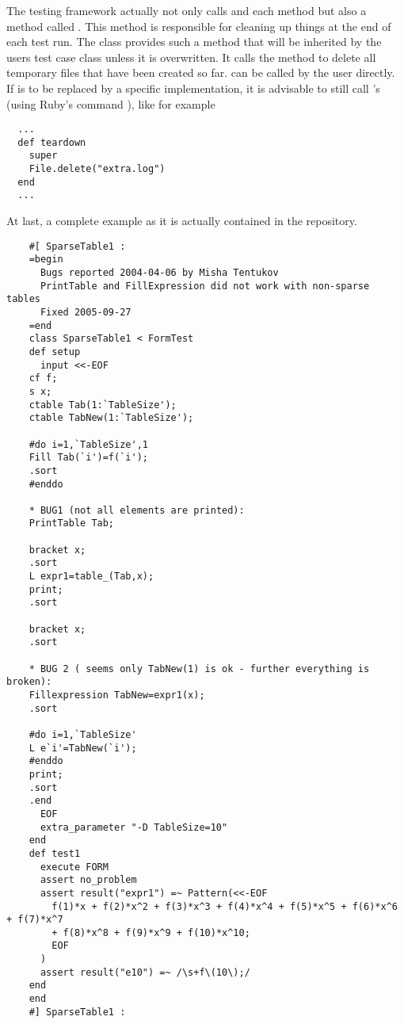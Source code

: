 The testing framework actually not only calls  and each  method
but also a method called . This method is responsible for cleaning
up things at the end of each test run. The class  provides such a
 method that will be inherited by the users test case class unless
it is overwritten. It calls the method  to delete all temporary
files that have been created so far.  can be called by the user
directly. If  is to be replaced by a specific implementation, it is
advisable to still call 's  (using Ruby's command
), like for example
\begin{verbatim}
  ...
  def teardown
    super
    File.delete("extra.log")
  end
  ...
\end{verbatim}

At last, a complete example as it is actually contained in the repository.
{\scriptsize
\begin{verbatim}
    #[ SparseTable1 :
    =begin
      Bugs reported 2004-04-06 by Misha Tentukov
      PrintTable and FillExpression did not work with non-sparse tables
      Fixed 2005-09-27
    =end
    class SparseTable1 < FormTest
    def setup
      input <<-EOF
    cf f;
    s x;
    ctable Tab(1:`TableSize');
    ctable TabNew(1:`TableSize');
    
    #do i=1,`TableSize',1
    Fill Tab(`i')=f(`i');
    .sort
    #enddo
    
    * BUG1 (not all elements are printed):
    PrintTable Tab;
    
    bracket x;
    .sort
    L expr1=table_(Tab,x);
    print;
    .sort
    
    bracket x;
    .sort
    
    * BUG 2 ( seems only TabNew(1) is ok - further everything is broken):
    Fillexpression TabNew=expr1(x);
    .sort
    
    #do i=1,`TableSize'
    L e`i'=TabNew(`i');
    #enddo
    print;
    .sort
    .end
      EOF
      extra_parameter "-D TableSize=10"
    end
    def test1
      execute FORM
      assert no_problem
      assert result("expr1") =~ Pattern(<<-EOF
        f(1)*x + f(2)*x^2 + f(3)*x^3 + f(4)*x^4 + f(5)*x^5 + f(6)*x^6 + f(7)*x^7
        + f(8)*x^8 + f(9)*x^9 + f(10)*x^10;
        EOF
      )
      assert result("e10") =~ /\s+f\(10\);/
    end
    end
    #] SparseTable1 :
\end{verbatim}}


